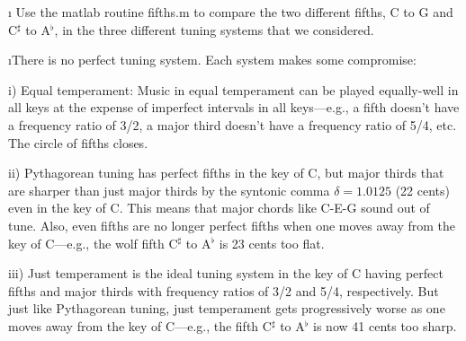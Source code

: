 \i \demo
Use the matlab routine fifths.m to compare the two
different fifths, C to G and C$^\sharp$ to A$^\flat$,
in the three different tuning systems that we considered.

\i There is no perfect tuning system.
Each system makes some compromise:

i) Equal temperament: Music in equal temperament 
can be played equally-well in all keys at the expense of 
imperfect intervals in all keys---e.g., a 
fifth doesn't have a frequency
ratio of 3/2, a major third doesn't have a frequency
ratio of 5/4, etc.
The circle of fifths closes.

ii) Pythagorean tuning has perfect fifths
in the key of C, but major thirds that 
are sharper than just major thirds by the 
syntonic comma $\delta = 1.0125$ (22 cents)
even in the key of C.
This means that major chords like 
C-E-G sound out of tune.
Also, even fifths are no longer perfect 
fifths when one moves away from the 
key of C---e.g., the wolf fifth 
C$^\sharp$ to A$^\flat$ is 23 cents too flat.

iii) Just temperament is the ideal tuning system
in the key of C having perfect fifths and major
thirds with frequency ratios of 3/2 and 5/4, 
respectively.
But just like Pythagorean tuning,
just temperament gets progressively worse as one 
moves away from the key of C---e.g., the 
fifth C$^\sharp$ to A$^\flat$ is now 41 cents too sharp.

\ei

